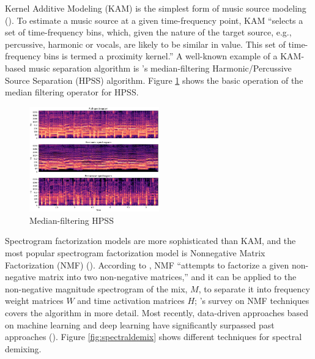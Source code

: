 \documentclass[report.tex]{subfiles}
\begin{document}
Kernel Additive Modeling (KAM) is the simplest form of music source modeling (\cite{musicsepgood}). To estimate a music source at a given time-frequency point, KAM ``selects a set of time-frequency bins, which, given the nature of the target source, e.g., percussive, harmonic or vocals, are likely to be similar in value. This set of time-frequency bins is termed a proximity kernel.'' A well-known example of a KAM-based music separation algorithm is \textcite{fitzgerald1}'s median-filtering Harmonic/Percussive Source Separation (HPSS) algorithm. Figure \ref{fig:fitzhpss} shows the basic operation of the median filtering operator for HPSS.

\begin{figure}[ht]
	\centering
	\includegraphics[width=0.5\textwidth]{./images-misc/hpss.png}
	\caption{Median-filtering HPSS}
	\label{fig:fitzhpss}
\end{figure}

Spectrogram factorization models are more sophisticated than KAM, and the most popular spectrogram factorization model is Nonnegative Matrix Factorization (NMF) (\cite{musicsepsurvey, musicsepgood}). According to \textcite{musicsepgood}, NMF ``attempts to factorize a given non-negative matrix into two non-negative matrices,'' and it can be applied to the non-negative magnitude spectrogram of the mix, $M$, to separate it into frequency weight matrices $W$ and time activation matrices $H$; \textcite{nmfpaper}'s survey on NMF techniques covers the algorithm in more detail. Most recently, data-driven approaches based on machine learning and deep learning have significantly surpassed past approaches (\cite{musicsepgood, sisec2018}). Figure \ref{fig:spectraldemix} shows different techniques for spectral demixing.
\end{document}
